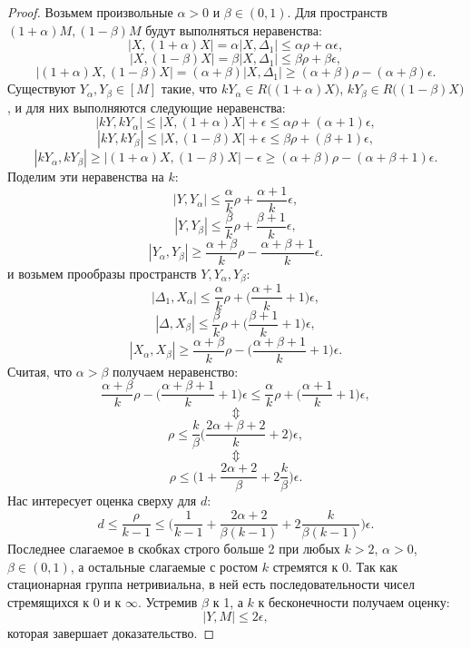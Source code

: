 \begin{proof}
  Возьмем произвольные $\alpha > 0$ и $\beta \in (0,1)$. Для
  пространств $(1+\alpha)M, (1-\beta)M$ будут выполняться неравенства:
  $$|X, (1+\alpha)X| = \alpha |X, \Delta_1| \le \alpha\rho + \alpha\epsilon,$$
  $$|X, (1-\beta)X| = \beta|X, \Delta_1| \le \beta\rho + \beta\epsilon,$$
  $$|(1+\alpha) X, (1-\beta)X| = (\alpha + \beta)|X, \Delta_1| \ge
  (\alpha+\beta)\rho - (\alpha+\beta)\epsilon.$$
  Существуют
  $Y_\alpha, Y_\beta \in [M]$ такие, что
  $kY_\alpha \in R\big((1+\alpha)X\big)$, $kY_\beta \in
  R\big((1-\beta)X\big)$, и
  для них выполняются следующие неравенства:
  $$|kY, kY_\alpha| \le |X, (1+\alpha)X| + \epsilon \le \alpha\rho +
  (\alpha+1)\epsilon,$$
  $$|kY, kY_\beta| \le |X, (1-\beta)X| + \epsilon \le \beta\rho +
  (\beta+1)\epsilon,$$
  $$|kY_\alpha, kY_\beta| \ge |(1+\alpha)X, (1-\beta)X| - \epsilon
  \ge  (\alpha+\beta)\rho - (\alpha+\beta+1)\epsilon.$$
  Поделим эти неравенства на $k$:
  $$|Y, Y_{\alpha}| \le \frac{\alpha}{k}\rho + \frac{\alpha+1}{k}\epsilon,$$
  $$|Y, Y_{\beta}| \le \frac{\beta}{k}\rho + \frac{\beta+1}{k}\epsilon,$$
  $$|Y_\alpha, Y_{\beta}| \ge \frac{\alpha+\beta}{k}\rho -
  \frac{\alpha+\beta+1}{k}\epsilon.$$
  и возьмем прообразы пространств $Y, Y_{\alpha}, Y_{\beta}$:
  $$|\Delta_1, X_{\alpha}| \le \frac{\alpha}{k}\rho +
  \big(\frac{\alpha+1}{k} + 1\big)\epsilon,$$
  $$|\Delta, X_{\beta}| \le \frac{\beta}{k}\rho +
  \big(\frac{\beta+1}{k}+1\big)\epsilon,$$
  $$|X_\alpha, X_{\beta}| \ge \frac{\alpha+\beta}{k}\rho -
  \big(\frac{\alpha+\beta+1}{k}+1\big)\epsilon.$$
  Считая, что $\alpha > \beta$ получаем неравенство:
  $$\frac{\alpha+\beta}{k}\rho -
  \big(\frac{\alpha+\beta+1}{k}+1\big)\epsilon \le
  \frac{\alpha}{k}\rho + \big(\frac{\alpha+1}{k} + 1\big)\epsilon,$$
  $$\Updownarrow$$
  $$\rho \le \frac{k}{\beta}\bigg(\frac{2\alpha+\beta+2}{k}+2\bigg)\epsilon,$$
  $$\Updownarrow$$
  $$\rho \le \bigg(1+\frac{2\alpha + 2}{\beta} +
  2\frac{k}{\beta}\bigg)\epsilon.$$
  Нас интересует оценка сверху для $d$:
  $$d \le \frac{\rho}{k-1} \le \bigg(\frac{1}{k-1}+\frac{2\alpha +
  2}{\beta(k-1)} + 2\frac{k}{\beta(k-1)}\bigg)\epsilon. $$
  Последнее слагаемое в скобках строго больше 2 при любых $k>2$, $\alpha>0$,
  $\beta\in (0,1)$, а остальные слагаемые с ростом $k$ стремятся к
  $0$. Так как стационарная группа нетривиальна, в ней есть
  последовательности чисел стремящихся к 0 и к $\infty$.
  Устремив $\beta$ к 1, а $k$ к бесконечности получаем оценку:
  $$|Y, M| \le 2\epsilon,$$
  которая завершает доказательство.

\end{proof}

